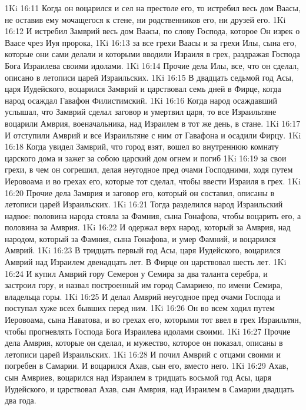 \vs 1Ki 16:11 Когда он воцарился и сел на престоле его, то истребил весь дом Ваасы, не оставив ему мочащегося к стене, ни родственников его, ни друзей его.
\vs 1Ki 16:12 И истребил Замврий весь дом Ваасы, по слову Господа, которое Он изрек о Ваасе чрез Иуя пророка,
\vs 1Ki 16:13 за все грехи Ваасы и за грехи Илы, сына его, которые они сами делали и которыми вводили Израиля в грех, раздражая Господа Бога Израилева своими идолами.
\rsbpar\vs 1Ki 16:14 Прочие дела Илы, все, что он сделал, описано в летописи царей Израильских.
\rsbpar\vs 1Ki 16:15 В двадцать седьмой год Асы, царя Иудейского, воцарился Замврий и царствовал семь дней в Фирце, когда народ осаждал Гавафон Филистимский.
\vs 1Ki 16:16 Когда народ осаждавший услышал, что Замврий сделал заговор и умертвил царя, то все Израильтяне воцарили Амврия, военачальника, над Израилем в тот же день, в стане.
\vs 1Ki 16:17 И отступили Амврий и все Израильтяне с ним от Гавафона и осадили Фирцу.
\vs 1Ki 16:18 Когда увидел Замврий, что город взят, вошел во внутреннюю комнату царского дома и зажег за собою царский дом огнем и погиб
\vs 1Ki 16:19 за свои грехи, в чем он согрешил, делая неугодное пред очами Господними, ходя путем Иеровоама и во грехах его, которые тот сделал, чтобы ввести Израиля в грех.
\rsbpar\vs 1Ki 16:20 Прочие дела Замврия и заговор его, который он составил, описаны в летописи царей Израильских.
\rsbpar\vs 1Ki 16:21 Тогда разделился народ Израильский надвое: половина народа стояла за Фамния, сына Гонафова, чтобы воцарить его, а половина за Амврия.
\vs 1Ki 16:22 И одержал верх народ, который за Амврия, над народом, который за Фамния, сына Гонафова, и умер Фамний, и воцарился Амврий.
\rsbpar\vs 1Ki 16:23 В тридцать первый год Асы, царя Иудейского, воцарился Амврий над Израилем  двенадцать лет. В Фирце он царствовал шесть лет.
\vs 1Ki 16:24 И купил Амврий гору Семерон у Семира за два таланта серебра, и застроил гору, и назвал построенный им город Самариею, по имени Семира, владельца горы.
\vs 1Ki 16:25 И делал Амврий неугодное пред очами Господа и поступал хуже всех бывших перед ним.
\vs 1Ki 16:26 Он во всем ходил путем Иеровоама, сына Наватова, и во грехах его, которыми тот ввел в грех Израильтян, чтобы прогневлять Господа Бога Израилева идолами своими.
\rsbpar\vs 1Ki 16:27 Прочие дела Амврия, которые он сделал, и мужество, которое он показал, описаны в летописи царей Израильских.
\vs 1Ki 16:28 И почил Амврий с отцами своими и погребен в Самарии. И воцарился Ахав, сын его, вместо него.
\rsbpar\vs 1Ki 16:29 Ахав, сын Амвриев, воцарился над Израилем в тридцать восьмой год Асы, царя Иудейского, и царствовал Ахав, сын Амврия, над Израилем в Самарии двадцать два года.
